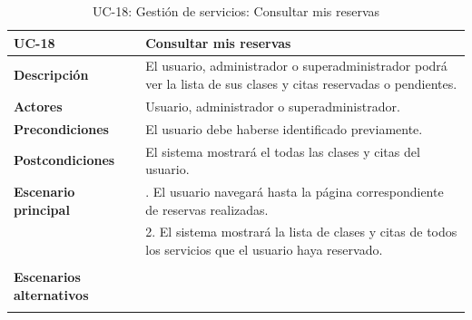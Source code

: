 \begin{table}[H]
  \begin{center}
    \begin{tabularx}{16.4cm}{|l|X|}
      \hline
      \textbf{UC-18} & \textbf{Consultar mis reservas}\\
      \hline
      \textbf{Descripción} & El usuario, administrador o superadministrador podrá ver la lista de sus clases y citas reservadas o pendientes. \\
      \hline
      \textbf{Actores} & Usuario, administrador o superadministrador. \\
      \hline
      \textbf{Precondiciones} & El usuario debe haberse identificado previamente.\\
      \hline
      \textbf{Postcondiciones} & El sistema mostrará el todas las clases y citas del usuario.\\
      \hline
      \textbf{Escenario principal} & \smallskip 1. El usuario navegará hasta la página correspondiente de reservas realizadas.\\
      & 2. El sistema mostrará la lista de clases y citas de todos los servicios que el usuario haya reservado.\\
      & \\
      \hline
      \textbf{Escenarios alternativos} & \\
      & \\
      \hline
    \end{tabularx}
    \caption{UC-18: Gestión de servicios: Consultar mis reservas}
    \label{tab:CU-reservas}
  \end{center}
\end{table}



